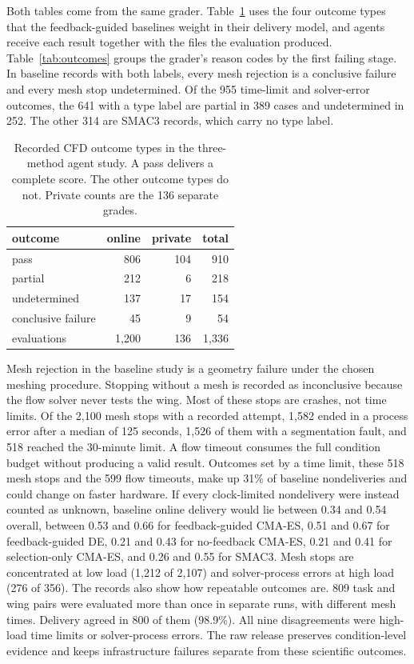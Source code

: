 \documentclass{article} %
\begin{document}
Both tables come from the same grader. Table~\ref{tab:agent-outcomes} uses the
four outcome types that the feedback-guided baselines weight in their delivery
model, and agents receive each result together with the files the evaluation
produced. Table~\ref{tab:outcomes} groups the grader's reason codes by
the first failing stage. In baseline records with both labels, every mesh
rejection is a conclusive failure and every mesh stop undetermined.
Of the 955 time-limit and solver-error outcomes, the 641 with a type label are partial in 389 cases and undetermined in 252. The other 314 are SMAC3 records, which carry no type label.

\begin{table}[htbp]
\caption{Recorded CFD outcome types in the three-method agent study. A pass
delivers a complete score. The other outcome types do not. Private counts are
the 136 separate grades.}
\label{tab:agent-outcomes}
\centering
\scriptsize
\setlength{\tabcolsep}{5pt}
\begin{tabular*}{\textwidth}{@{\extracolsep{\fill}}lrrr}
\toprule
outcome & online & private & total \\
\midrule
pass & 806 & 104 & 910 \\
partial & 212 & 6 & 218 \\
undetermined & 137 & 17 & 154 \\
conclusive failure & 45 & 9 & 54 \\
\midrule
evaluations & 1{,}200 & 136 & 1{,}336 \\
\bottomrule
\end{tabular*}
\end{table}

Mesh rejection in the baseline study is a geometry failure under the chosen
meshing procedure. Stopping without a mesh is recorded as inconclusive because
the flow solver never tests the wing. Most of these stops are crashes, not time
limits. Of the 2{,}100 mesh stops with a recorded attempt, 1{,}582 ended in a
process error after a median of 125 seconds, 1{,}526 of them with a
segmentation fault, and 518 reached the 30-minute limit. A flow timeout consumes
the full condition budget without producing a valid result. Outcomes set by a
time limit, these 518 mesh stops and the 599 flow timeouts, make up 31\% of
baseline nondeliveries and could change on faster hardware. If every
clock-limited nondelivery were instead counted as unknown, baseline online
delivery would lie between 0.34 and 0.54 overall, between 0.53 and 0.66 for
feedback-guided CMA-ES, 0.51 and 0.67 for feedback-guided DE, 0.21 and 0.43
for no-feedback CMA-ES, 0.21 and 0.41 for selection-only CMA-ES, and 0.26 and
0.55 for SMAC3. Mesh stops are
concentrated at low load (1{,}212 of 2{,}107) and solver-process errors at high
load (276 of 356). The records also show how repeatable outcomes are. 809
task and wing pairs were evaluated more than once in separate runs, with
different mesh times. Delivery agreed in 800 of them (98.9\%). All nine
disagreements were high-load time limits or solver-process errors.
The raw release preserves condition-level evidence and keeps infrastructure
failures separate from these scientific outcomes.
\end{document}
